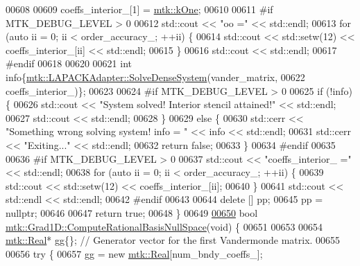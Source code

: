 \begin{DoxyCode}
{{00608 
00609   coeffs\_interior\_[1] = \hyperlink{group__c01-roots_ga26407c24d43b6b95480943340d285c71}{mtk::kOne};
00610 
00611 \textcolor{preprocessor}{  #if MTK\_DEBUG\_LEVEL > 0}
00612   std::cout << \textcolor{stringliteral}{"oo ="} << std::endl;
00613   \textcolor{keywordflow}{for} (\textcolor{keyword}{auto} ii = 0; ii < order\_accuracy\_; ++ii) \{
00614     std::cout << std::setw(12) << coeffs\_interior\_[ii] << std::endl;
00615   \}
00616   std::cout << std::endl;
00617 \textcolor{preprocessor}{  #endif}
00618 
00620 
00621   \textcolor{keywordtype}{int} info\{\hyperlink{classmtk_1_1LAPACKAdapter_a7428bccf74fd4a4af68fb7233846da22}{mtk::LAPACKAdapter::SolveDenseSystem}(vander\_matrix,
00622                                                 coeffs\_interior\_)\};
00623 
00624 \textcolor{preprocessor}{  #if MTK\_DEBUG\_LEVEL > 0}
00625   \textcolor{keywordflow}{if} (!info) \{
00626     std::cout << \textcolor{stringliteral}{"System solved! Interior stencil attained!"} << std::endl;
00627     std::cout << std::endl;
00628   \}
00629   \textcolor{keywordflow}{else} \{
00630     std::cerr << \textcolor{stringliteral}{"Something wrong solving system! info = "} << info << std::endl;
00631     std::cerr << \textcolor{stringliteral}{"Exiting..."} << std::endl;
00632     \textcolor{keywordflow}{return} \textcolor{keyword}{false};
00633   \}
00634 \textcolor{preprocessor}{  #endif}
00635 
00636 \textcolor{preprocessor}{  #if MTK\_DEBUG\_LEVEL > 0}
00637   std::cout << \textcolor{stringliteral}{"coeffs\_interior\_ ="} << std::endl;
00638   \textcolor{keywordflow}{for} (\textcolor{keyword}{auto} ii = 0; ii < order\_accuracy\_; ++ii) \{
00639     std::cout << std::setw(12) << coeffs\_interior\_[ii];
00640   \}
00641   std::cout << std::endl << std::endl;
00642 \textcolor{preprocessor}{  #endif}
00643 
00644   \textcolor{keyword}{delete} [] pp;
00645   pp = \textcolor{keyword}{nullptr};
00646 
00647   \textcolor{keywordflow}{return} \textcolor{keyword}{true};
00648 \}
00649 
\hypertarget{mtk__grad__1d_8cc_source_l00650}{}\hyperlink{classmtk_1_1Grad1D_a2d03e6a3961bee558f575ec4099782a9}{00650} \textcolor{keywordtype}{bool} \hyperlink{classmtk_1_1Grad1D_a2d03e6a3961bee558f575ec4099782a9}{mtk::Grad1D::ComputeRationalBasisNullSpace}(\textcolor{keywordtype}{void}) \{
00651 
00653 
00654   \hyperlink{group__c01-roots_gac080bbbf5cbb5502c9f00405f894857d}{mtk::Real}* gg\{\}; \textcolor{comment}{// Generator vector for the first Vandermonde matrix.}
00655 
00656   \textcolor{keywordflow}{try} \{
00657     gg = \textcolor{keyword}{new} \hyperlink{group__c01-roots_gac080bbbf5cbb5502c9f00405f894857d}{mtk::Real}[num\_bndy\_coeffs\_];
}}
\end{DoxyCode}
